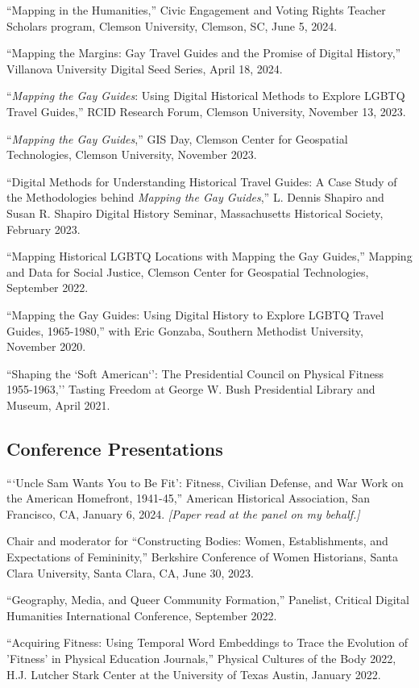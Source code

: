 \documentclass[11pt]{article}
\begin{document}
``Mapping in the Humanities,'' Civic Engagement and Voting Rights Teacher Scholars program, Clemson University, Clemson, SC, June 5, 2024.

``Mapping the Margins: Gay Travel Guides and the Promise of Digital History,'' Villanova University Digital Seed Series, April 18, 2024.

``\emph{Mapping the Gay Guides}: Using Digital Historical Methods to Explore LGBTQ Travel Guides,'' RCID Research Forum, Clemson University, November 13, 2023.

``\emph{Mapping the Gay Guides},'' GIS Day, Clemson Center for Geospatial Technologies, Clemson University, November 2023. 

``Digital Methods for Understanding Historical Travel Guides: A Case Study of the Methodologies behind \emph{Mapping the Gay Guides},'' L. Dennis Shapiro and Susan R. Shapiro Digital History Seminar, Massachusetts Historical Society, February 2023. 

``Mapping Historical LGBTQ Locations with Mapping the Gay Guides,'' Mapping and Data for Social Justice, Clemson Center for Geospatial Technologies, September 2022.

``Mapping the Gay Guides: Using Digital History to Explore LGBTQ Travel Guides, 1965-1980,'' with Eric Gonzaba, Southern Methodist University, November 2020.

``Shaping the `Soft American`': The Presidential Council on Physical Fitness 1955-1963,'' Tasting Freedom at George W. Bush Presidential Library and Museum, April 2021.

\subsection{Conference Presentations}
```Uncle Sam Wants You to Be Fit': Fitness, Civilian Defense, and War Work on the American Homefront, 1941-45,'' American Historical Association, San Francisco, CA, January 6, 2024. \emph{[Paper read at the panel on my behalf.]}

Chair and moderator for ``Constructing Bodies: Women, Establishments, and Expectations of Femininity,'' Berkshire Conference of Women Historians, Santa Clara University, Santa Clara, CA, June 30, 2023.

``Geography, Media, and Queer Community Formation,'' Panelist, Critical Digital Humanities International Conference, September 2022.

``Acquiring Fitness: Using Temporal Word Embeddings to Trace the Evolution of 'Fitness' in Physical Education Journals,'' Physical Cultures of the Body 2022, H.J. Lutcher Stark Center at the University of Texas Austin, January 2022.
\end{document}
